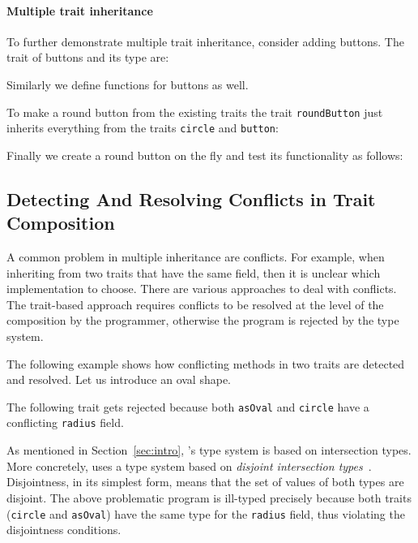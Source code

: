 \paragraph{Multiple trait inheritance} To further demonstrate multiple
trait inheritance, consider adding buttons. The trait of buttons and its type are:

Similarly we define functions for buttons as well.

\noindent To make a round button from the existing traits the trait
\lstinline{roundButton} just inherits everything from the traits
\lstinline{circle} and \lstinline{button}:

\noindent Finally we create a round button on the fly and test its functionality
as follows:

\subsection{Detecting And Resolving Conflicts in Trait Composition}
\label{sec:conflicts}

A common problem in multiple inheritance are conflicts. For example, when
inheriting from two traits that have the same field, then it is unclear which
implementation to choose. There are various approaches to deal with conflicts.
The trait-based approach requires conflicts to be resolved at the level of the
composition by the programmer, otherwise the program is rejected by the type
system.

The following example shows how conflicting methods in two traits are detected
and resolved. Let us introduce an oval shape.

The following trait gets rejected because both \lstinline{asOval} and
\lstinline{circle} have a conflicting \lstinline{radius} field.

\noindent As mentioned in Section~\ref{sec:intro}, \name's type system is based
on intersection types. More concretely, \name uses a type system based on
\emph{disjoint intersection types}~\cite{oliveira2016disjoint}. Disjointness, in
its simplest form, means that the set of values of both types are disjoint. The
above problematic program is ill-typed precisely because both
traits (\lstinline{circle} and \lstinline{asOval}) have the same type for the
\lstinline{radius} field, thus violating the disjointness conditions.

